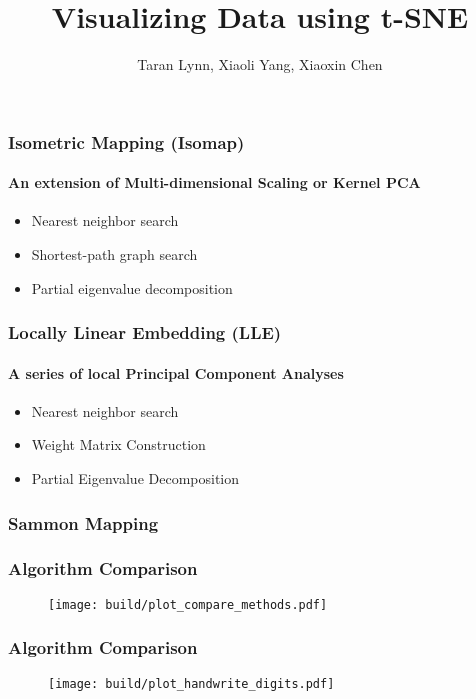 \documentclass{beamer}
\title{Visualizing Data using t-SNE}
\author{Taran Lynn, Xiaoli Yang, Xiaoxin Chen}
\begin{document}
\maketitle

% 
% 
% 
% 
\begin{frame}
  \frametitle{Isometric Mapping (Isomap)}
  \framesubtitle{An extension of Multi-dimensional Scaling or Kernel PCA}

  \begin{itemize}
    \item Nearest neighbor search
    \item Shortest-path graph search
    \item Partial eigenvalue decomposition
  \end{itemize}

\end{frame}

% 
% 
% 
% 
% 
% 
\begin{frame}
  \frametitle{Locally Linear Embedding (LLE)}
  \framesubtitle{A series of local Principal Component Analyses}

  \begin{itemize}
    \item Nearest neighbor search
    \item Weight Matrix Construction
    \item Partial Eigenvalue Decomposition
  \end{itemize}

\end{frame}

% 
% 
% 
% 
% 
% 
\begin{frame}
  \frametitle{Sammon Mapping }
  \framesubtitle{}

\end{frame}


% 
% 
% 
% 
% 
%
\begin{frame}
\frametitle{Algorithm Comparison}
\begin{figure}
  \centering
  \texttt{[image: build/plot\_compare\_methods.pdf]}
\end{figure}
\end{frame}

% 
% 
% 
% 
% 
%
\begin{frame}
  \frametitle{Algorithm Comparison}
  \begin{figure}
    \centering
    \texttt{[image: build/plot\_handwrite\_digits.pdf]}
  \end{figure}
  \end{frame}
\end{document}
